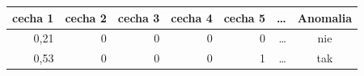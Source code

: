 \begin{tabular}{rrrrrrc}
\toprule
cecha 1 & cecha 2 & cecha 3 & cecha 4 & cecha 5 & \dots & Anomalia \\
\midrule
0,21 & 0 & 0 & 0 & 0 & \dots & nie \\
0,53 & 0 & 0 & 0 & 1 & \dots & tak \\
\bottomrule
\end{tabular}
